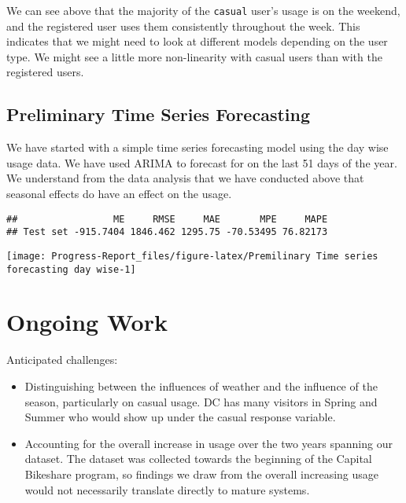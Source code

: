 \documentclass[
]{article}
\begin{document}
We can see above that the majority of the \texttt{casual} user's usage
is on the weekend, and the registered user uses them consistently
throughout the week. This indicates that we might need to look at
different models depending on the user type. We might see a little more
non-linearity with casual users than with the registered users.

\hypertarget{preliminary-time-series-forecasting}{%
\subsection{Preliminary Time Series
Forecasting}\label{preliminary-time-series-forecasting}}

We have started with a simple time series forecasting model using the
day wise usage data. We have used ARIMA to forecast for on the last 51
days of the year. We understand from the data analysis that we have
conducted above that seasonal effects do have an effect on the usage.

\begin{verbatim}
##                 ME     RMSE     MAE       MPE     MAPE
## Test set -915.7404 1846.462 1295.75 -70.53495 76.82173
\end{verbatim}

\begin{center}\texttt{[image: Progress-Report\_files/figure-latex/Premilinary Time series forecasting day wise-1]} \end{center}

\hypertarget{ongoing-work}{%
\section{Ongoing Work}\label{ongoing-work}}

Anticipated challenges:

\begin{itemize}
\item
  Distinguishing between the influences of weather and the influence of
  the season, particularly on casual usage. DC has many visitors in
  Spring and Summer who would show up under the casual response
  variable.
\item
  Accounting for the overall increase in usage over the two years
  spanning our dataset. The dataset was collected towards the beginning
  of the Capital Bikeshare program, so findings we draw from the overall
  increasing usage would not necessarily translate directly to mature
  systems.
\end{itemize}
\end{document}
